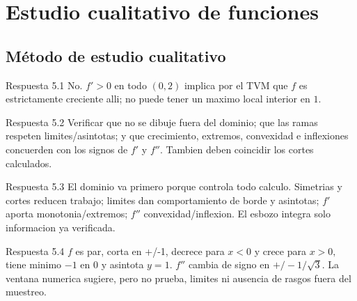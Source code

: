 \documentclass[10pt,a4paper,oneside,openany]{book}
\begin{document}
\chapter{Estudio cualitativo de funciones}
\section{Método de estudio cualitativo}
\begin{PSevenAnswerFixed}{Respuesta 5.1}
No. \(f'>0\) en todo \((0,2)\) implica por el TVM que \(f\) es estrictamente creciente alli; no puede tener un maximo local interior en \(1\).
\end{PSevenAnswerFixed}
\begin{PSevenAnswerFixed}{Respuesta 5.2}
Verificar que no se dibuje fuera del dominio; que las ramas respeten limites/asintotas; y que crecimiento, extremos, convexidad e inflexiones concuerden con los signos de \(f'\) y \(f''\). Tambien deben coincidir los cortes calculados.
\end{PSevenAnswerFixed}
\begin{PSevenAnswerFixed}{Respuesta 5.3}
El dominio va primero porque controla todo calculo. Simetrias y cortes reducen trabajo; limites dan comportamiento de borde y asintotas; \(f'\) aporta monotonia/extremos; \(f''\) convexidad/inflexion. El esbozo integra solo informacion ya verificada.
\end{PSevenAnswerFixed}
\begin{PSevenAnswerFixed}{Respuesta 5.4}
\(f\) es par, corta en +/-1, decrece para \(x<0\) y crece para \(x>0,\) tiene minimo \(-1\) en \(0\) y asintota \(y=1\). \(f''\) cambia de signo en \(+/-1/\sqrt{3}\). La ventana numerica sugiere, pero no prueba, limites ni ausencia de rasgos fuera del muestreo.
\end{PSevenAnswerFixed}
\end{document}
